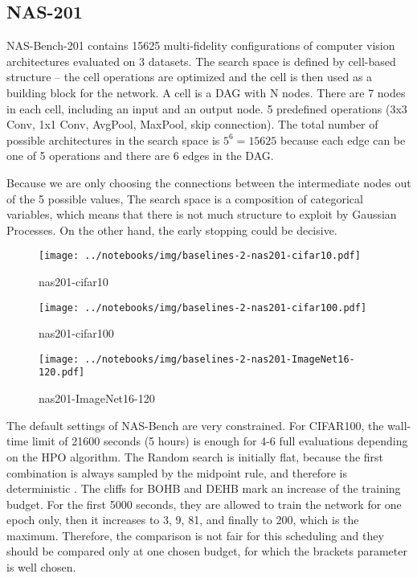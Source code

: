 \subsection{NAS-201}
NAS-Bench-201 contains 15625 multi-fidelity configurations of computer vision architectures evaluated on 3 datasets. The search space is defined by cell-based structure -- the cell operations are optimized and the cell is then used as a building block for the network. A cell is a DAG with N nodes. There are 7 nodes in each cell, including an input and an output node. 5 predefined operations (3x3 Conv, 1x1 Conv, AvgPool, MaxPool, skip connection). The total number of possible architectures in the search space is $5^6=15625$ because each edge can be one of 5 operations and there are 6 edges in the DAG. %

Because we are only choosing the connections between the intermediate nodes out of the 5 possible values, The search space is a composition of categorical variables, which means that there is not much structure to exploit by Gaussian Processes. On the other hand, the early stopping could be decisive.
\begin{figure}[H]
    \centering
    \texttt{[image: ../notebooks/img/baselines-2-nas201-cifar10.pdf]}
    \caption{nas201-cifar10}
\end{figure}

\begin{figure}[H]
    \centering
    \texttt{[image: ../notebooks/img/baselines-2-nas201-cifar100.pdf]}
    \caption{nas201-cifar100}
\end{figure}

\begin{figure}[H]
    \centering
    \texttt{[image: ../notebooks/img/baselines-2-nas201-ImageNet16-120.pdf]}
    \caption{nas201-ImageNet16-120}
\end{figure}

The default settings of NAS-Bench are very constrained. For CIFAR100, the wall-time limit of 21600 seconds (5 hours) is enough for 4-6 full evaluations depending on the HPO algorithm. The Random search is initially flat, because the first combination is always sampled by the midpoint rule, and therefore is deterministic . The cliffs for BOHB and DEHB mark an increase of the training budget. For the first 5000 seconds, they are allowed to train the network for one epoch only, then it increases to 3, 9, 81, and finally to 200, which is the maximum. Therefore, the comparison is not fair for this scheduling and they should be compared only at one chosen budget, for which the brackets parameter is well chosen.



